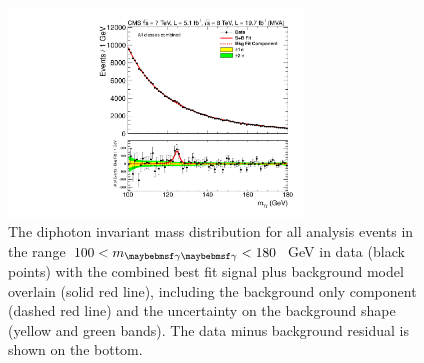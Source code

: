 \begin{figure}
  \includegraphics[width=0.7\textwidth]{results/plots/mgg_mva_fullrange_combcat78TeV_unweighted.pdf}
  \caption[The unweighted diphoton invariant mass distribution for all analysis events in data with the combined best fit signal plus background model overlain.]{The diphoton invariant mass distribution for all analysis events in the range $100<\mgg<180$~GeV in data (black points) with the combined best fit signal plus background model overlain (solid red line), including the background only component (dashed red line) and the uncertainty on the background shape (yellow and green bands). The data minus background residual is shown on the bottom.}
  \label{fig:sbfit_unw}
\end{figure}

